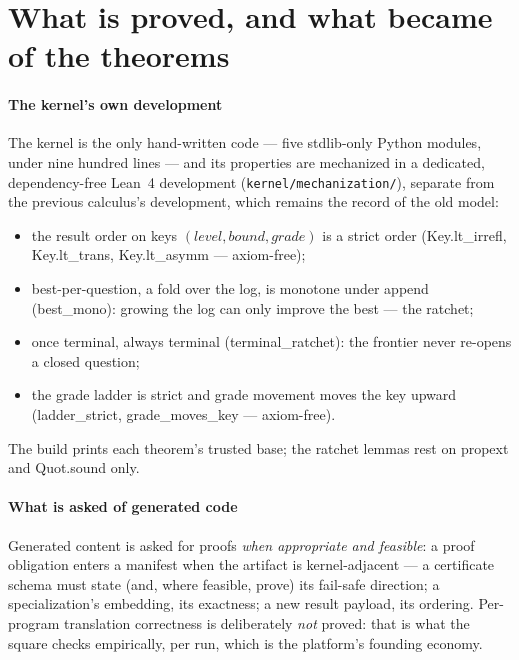 
\section{What is proved, and what became of the theorems}
\label{sec:proofs}

\paragraph{The kernel's own development}
The kernel is the only hand-written code --- five stdlib-only Python
modules, under nine hundred lines --- and its properties are
mechanized in a dedicated, dependency-free Lean~4 development
(\texttt{kernel/mechanization/}), separate from the previous
calculus's development, which remains the record of the old model:

\begin{itemize}
\item the result order on keys $(\textit{level}, \textit{bound},
  \textit{grade})$ is a strict order
  (\textsf{Key.lt\_irrefl}, \textsf{Key.lt\_trans},
  \textsf{Key.lt\_asymm} --- axiom-free);
\item best-per-question, a fold over the log, is monotone under
  append (\textsf{best\_mono}): growing the log can only improve the
  best --- the ratchet;
\item once terminal, always terminal (\textsf{terminal\_ratchet}):
  the frontier never re-opens a closed question;
\item the grade ladder is strict and grade movement moves the key
  upward (\textsf{ladder\_strict}, \textsf{grade\_moves\_key} ---
  axiom-free).
\end{itemize}

\noindent
The build prints each theorem's trusted base; the ratchet lemmas
rest on \textsf{propext} and \textsf{Quot.sound} only.

\paragraph{What is asked of generated code}
Generated content is asked for proofs \emph{when appropriate and
feasible}: a proof obligation enters a manifest when the artifact is
kernel-adjacent --- a certificate schema must state (and, where
feasible, prove) its fail-safe direction; a specialization's
embedding, its exactness; a new result payload, its ordering.
Per-program translation correctness is deliberately \emph{not}
proved: that is what the square checks empirically, per run, which
is the platform's founding economy.

